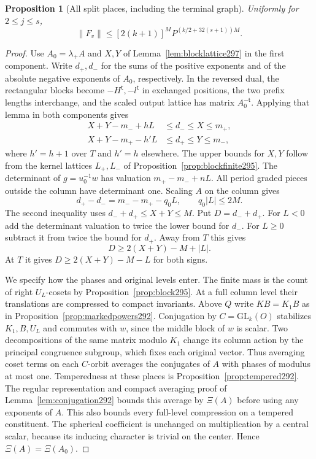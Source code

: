 \documentclass[a4paper,11pt]{article}
\newtheorem{proposition}{Proposition}[section]
\theoremstyle{definition}
\theoremstyle{remark}
\numberwithin{equation}{section}
\begin{document}
\begin{proposition}[All split places, including the terminal graph]\leavevmode
\label{prop:blocksplit297}
Uniformly for \(2\le j\le s\),
\[
       \|F_v\|\le [2(k+1)]^M P^{(k/2+32(s+1))M}.
\]
\end{proposition}
\begin{proof}
Use \(A_0=\lambda_+ A\) and \(X,Y\) of
Lemma~\ref{lem:blocklattice297} in the first component.
Write \(d_+,d_-\) for the sums of the positive exponents
and of the absolute negative exponents of \(A_0\), respectively.
In the reversed dual, the rectangular blocks become
\(-H^{\mathsf t},-l^{\mathsf t}\) in exchanged positions,
the two prefix lengths interchange, and the scaled output
lattice has matrix \(A_0^{-{\mathsf t}}\).
Applying that lemma in both components gives
\[
 \begin{aligned}
 X+Y-m_-+hL &\le d_-\le X\le m_+,\\
 X+Y-m_+-h'L &\le d_+\le Y\le m_- ,
 \end{aligned}
\]
where \(h'=h+1\) over \(T\) and \(h'=h\) elsewhere.
The upper bounds for \(X,Y\) follow from the kernel lattices
\(L_+,L_-\) of Proposition~\ref{prop:blockfinite295}.
The determinant of \(g=u_0^{-1}w\) has valuation
\(m_+-m_-+nL\). All period graded pieces outside the column
have determinant one. Scaling \(A\) on the column gives
\[
 d_+-d_-=m_--m_+-q_0 L,\qquad q_0|L|\le2M .
\]
The second inequality uses \(d_-+d_+\le X+Y\le M\).
Put \(D=d_-+d_+\). For \(L<0\) add the determinant valuation
to twice the lower bound for \(d_-\). For \(L\ge0\) subtract
it from twice the bound for \(d_+\). Away from \(T\) this gives
\[
        D\ge 2(X+Y)-M+|L|.
\]
At \(T\) it gives \(D\ge 2(X+Y)-M-L\) for both signs.

We specify how the phases and original levels enter. The
finite mass is the count of right \(U_L\)-cosets by
Proposition~\ref{prop:block295}. At a full column level their
translations are compressed to compact invariants. Above
\(Q\) write \(KB=K_1B\) as in Proposition~\ref{prop:markedpowers292}.
Conjugation by \(C=\mathrm{GL}_k(O)\) stabilizes \(K_1,B,U_L\)
and commutes with \(w\), since the middle block of \(w\) is
scalar. Two decompositions of the same matrix modulo \(K_1\)
change its column action by the principal congruence subgroup,
which fixes each original vector. Thus averaging coset terms
on each \(C\)-orbit averages the conjugates of \(A\) with
phases of modulus at most one. Temperedness at these places
is Proposition~\ref{prop:tempered292}. The regular representation
and compact averaging proof of Lemma~\ref{lem:conjugation292}
bounds this average by \(\Xi(A)\) before using any exponents
of \(A\). This also bounds every full-level compression on a
tempered constituent. The spherical coefficient is unchanged
on multiplication by a central scalar, because its inducing
character is trivial on the center. Hence \(\Xi(A)=\Xi(A_0)\).


\end{proof}
\end{document}
